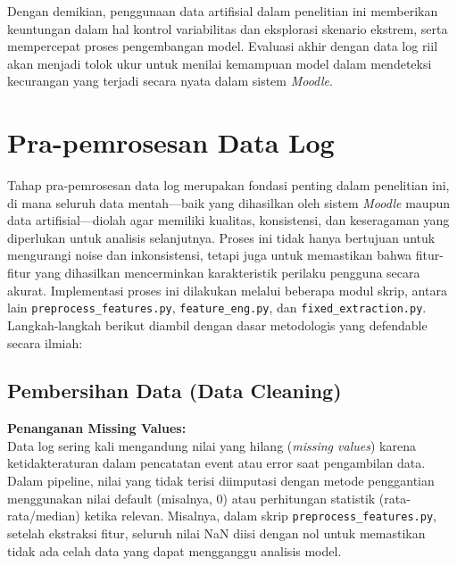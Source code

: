 Dengan demikian, penggunaan data artifisial dalam penelitian ini memberikan keuntungan dalam hal kontrol variabilitas dan eksplorasi skenario ekstrem, serta mempercepat proses pengembangan model. Evaluasi akhir dengan data log riil akan menjadi tolok ukur untuk menilai kemampuan model dalam mendeteksi kecurangan yang terjadi secara nyata dalam sistem \textit{Moodle}.

\section{Pra-pemrosesan Data Log}
\label{sec:praPemrosesanDataLog}
Tahap pra-pemrosesan data log merupakan fondasi penting dalam penelitian ini, di mana seluruh data mentah—baik yang dihasilkan oleh sistem \textit{Moodle} maupun data artifisial—diolah agar memiliki kualitas, konsistensi, dan keseragaman yang diperlukan untuk analisis selanjutnya. Proses ini tidak hanya bertujuan untuk mengurangi noise dan inkonsistensi, tetapi juga untuk memastikan bahwa fitur-fitur yang dihasilkan mencerminkan karakteristik perilaku pengguna secara akurat. Implementasi proses ini dilakukan melalui beberapa modul skrip, antara lain \texttt{preprocess\_features.py}, \texttt{feature\_eng.py}, dan \texttt{fixed\_extraction.py}. Langkah-langkah berikut diambil dengan dasar metodologis yang defendable secara ilmiah:

\subsection{Pembersihan Data (Data Cleaning)}
\label{sec:pembersihanData}
\textbf{Penanganan Missing Values:} \\
Data log sering kali mengandung nilai yang hilang (\textit{missing values}) karena ketidakteraturan dalam pencatatan event atau error saat pengambilan data. Dalam pipeline, nilai yang tidak terisi diimputasi dengan metode penggantian menggunakan nilai default (misalnya, 0) atau perhitungan statistik (rata-rata/median) ketika relevan. Misalnya, dalam skrip \texttt{preprocess\_features.py}, setelah ekstraksi fitur, seluruh nilai NaN diisi dengan nol untuk memastikan tidak ada celah data yang dapat mengganggu analisis model.

